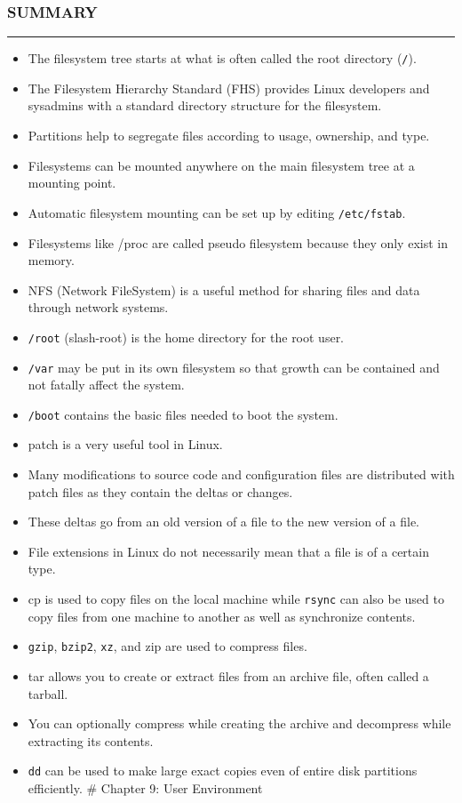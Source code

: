 \subsubsection{SUMMARY}\label{summary-6}

\begin{center}\rule{3in}{0.4pt}\end{center}

\begin{itemize}
\itemsep1pt\parskip0pt
\item
  The filesystem tree starts at what is often called the root directory
  (\texttt{/}).
\item
  The Filesystem Hierarchy Standard (FHS) provides Linux developers and
  sysadmins with a standard directory structure for the filesystem.
\item
  Partitions help to segregate files according to usage, ownership, and
  type.
\item
  Filesystems can be mounted anywhere on the main filesystem tree at a
  mounting point.
\item
  Automatic filesystem mounting can be set up by editing
  \texttt{/etc/fstab}.
\item
  Filesystems like /proc are called pseudo filesystem because they only
  exist in memory.
\item
  NFS (Network FileSystem) is a useful method for sharing files and data
  through network systems.
\item
  \texttt{/root} (slash-root) is the home directory for the root user.
\item
  \texttt{/var} may be put in its own filesystem so that growth can be
  contained and not fatally affect the system.
\item
  \texttt{/boot} contains the basic files needed to boot the system.
\item
  patch is a very useful tool in Linux.
\item
  Many modifications to source code and configuration files are
  distributed with patch files as they contain the deltas or changes.
\item
  These deltas go from an old version of a file to the new version of a
  file.
\item
  File extensions in Linux do not necessarily mean that a file is of a
  certain type.
\item
  cp is used to copy files on the local machine while \texttt{rsync} can
  also be used to copy files from one machine to another as well as
  synchronize contents.
\item
  \texttt{gzip}, \texttt{bzip2}, \texttt{xz}, and zip are used to
  compress files.
\item
  tar allows you to create or extract files from an archive file, often
  called a tarball.
\item
  You can optionally compress while creating the archive and decompress
  while extracting its contents.
\item
  \texttt{dd} can be used to make large exact copies even of entire disk
  partitions efficiently. \# Chapter 9: User Environment
\end{itemize}

